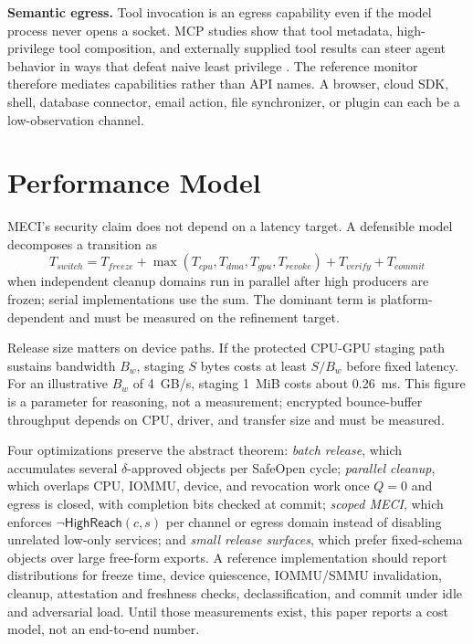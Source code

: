 \documentclass[11pt,letterpaper]{article}
\theoremstyle{plain}
\theoremstyle{definition}
\newcommand{\HR}{\mathsf{HighReach}}
\begin{document}
\textbf{Semantic egress.} Tool invocation is an egress capability even if the model process never opens a socket. MCP studies show that tool metadata, high-privilege tool composition, and externally supplied tool results can steer agent behavior in ways that defeat naive least privilege \cite{mcpitp,mcpshield}. The reference monitor therefore mediates capabilities rather than API names. A browser, cloud SDK, shell, database connector, email action, file synchronizer, or plugin can each be a low-observation channel.

\section{Performance Model}\label{sec:perf}

MECI's security claim does not depend on a latency target. A defensible model decomposes a transition as
\begin{equation}
T_{\mathit{switch}} = T_{\mathit{freeze}} + \max(T_{\mathit{cpu}}, T_{\mathit{dma}}, T_{\mathit{gpu}}, T_{\mathit{revoke}}) + T_{\mathit{verify}} + T_{\mathit{commit}}
\end{equation}
when independent cleanup domains run in parallel after high producers are frozen; serial implementations use the sum. The dominant term is platform-dependent and must be measured on the refinement target.

Release size matters on device paths. If the protected CPU-GPU staging path sustains bandwidth $B_w$, staging $S$ bytes costs at least $S/B_w$ before fixed latency. For an illustrative $B_w$ of 4~GB/s, staging 1~MiB costs about 0.26~ms. This figure is a parameter for reasoning, not a measurement; encrypted bounce-buffer throughput depends on CPU, driver, and transfer size and must be measured.

Four optimizations preserve the abstract theorem: \emph{batch release}, which accumulates several $\delta$-approved objects per SafeOpen cycle; \emph{parallel cleanup}, which overlaps CPU, IOMMU, device, and revocation work once $Q = 0$ and egress is closed, with completion bits checked at commit; \emph{scoped MECI}, which enforces $\neg\HR(c,s)$ per channel or egress domain instead of disabling unrelated low-only services; and \emph{small release surfaces}, which prefer fixed-schema objects over large free-form exports. A reference implementation should report distributions for freeze time, device quiescence, IOMMU/SMMU invalidation, cleanup, attestation and freshness checks, declassification, and commit under idle and adversarial load. Until those measurements exist, this paper reports a cost model, not an end-to-end number.
\end{document}
